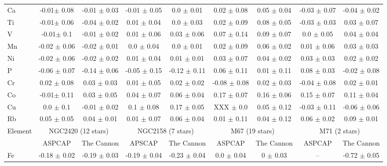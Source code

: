 \documentclass[14pt, preprint2]{aastex6}
\begin{document}
\begin{table}[h]
\begin{tabular}{ | p{} | c| c | c | c | c | c | c | c | }
Ca & -0.01$\pm$ 0.08 & -0.01 $\pm$ 0.03 & -0.01 $\pm$ 0.05  & 0.0 $\pm$ 0.01 & 0.02 $\pm$ 0.08 & 0.05 $\pm$ 0.04 &  -0.03 $\pm$ 0.07 & -0.04 $\pm$ 0.02 \\
Ti & -0.01$\pm$ 0.06 & -0.04 $\pm$ 0.02 & 0.01 $\pm$ 0.04  & 0.0 $\pm$ 0.03 & 0.02 $\pm$ 0.09 & 0.08 $\pm$ 0.05 &  -0.03 $\pm$ 0.03 & 0.03 $\pm$ 0.07 \\
V & -0.01$\pm$ 0.1 &  -0.01 $\pm$ 0.02 & 0.01 $\pm$ 0.06 & 0.03 $\pm$ 0.06 & 0.07 $\pm$ 0.14 & 0.09 $\pm$ 0.07 & 0.0 $\pm$ 0.05  & 0.04 $\pm$ 0.04 \\
Mn & -0.02 $\pm$ 0.06 & -0.02 $\pm$ 0.01  &  0.0 $\pm$ 0.04 & 0.0 $\pm$ 0.01 & 0.02 $\pm$ 0.09 & 0.06 $\pm$ 0.02 & 0.01 $\pm$ 0.06  & 0.03 $\pm$ 0.03 \\
Ni & -0.02 $\pm$ 0.06 & -0.02 $\pm$ 0.02  &  0.01 $\pm$ 0.04 & 0.01 $\pm$ 0.01 & 0.03 $\pm$ 0.07 & 0.04 $\pm$ 0.02 & 0.03 $\pm$ 0.03  & 0.02 $\pm$ 0.02 \\
P & -0.06 $\pm$ 0.07 &  -0.14 $\pm$ 0.06  & -0.05 $\pm$ 0.15 & -0.12 $\pm$ 0.11 & 0.06 $\pm$ 0.11 & 0.01 $\pm$ 0.11 & 0.08 $\pm$ 0.03  & -0.02 $\pm$ 0.08 \\
Cr & 0.02 $\pm$ 0.08 &  0.03 $\pm$ 0.03 &  0.01 $\pm$ 0.05 & 0.02 $\pm$ 0.02 & -0.08 $\pm$ 0.08 &0.02 $\pm$ 0.03 & -0.04 $\pm$ 0.08  &  0.02 $\pm$ 0.01 \\
Co & -0.01$\pm$ 0.11 & 0.03 $\pm$ 0.05 &  0.04 $\pm$ 0.07 & 0.06 $\pm$ 0.04 & 0.17 $\pm$ 0.07 & 0.16 $\pm$ 0.06 &  0.15 $\pm$ 0.07 &  0.11 $\pm$ 0.04 \\
Cu &  0.0 $\pm$ 0.1 & -0.01 $\pm$ 0.02 & 0.1 $\pm$ 0.08 & 0.17 $\pm$ 0.05 & XXX $\pm$ 0.0 & 0.05 $\pm$ 0.12 &  -0.03 $\pm$ 0.11 & -0.06 $\pm$ 0.06 \\
Rb & 0.05 $\pm$ 0.05 & 0.04 $\pm$ 0.01  &  0.01 $\pm$ 0.07 & 0.06 $\pm$ 0.04 & 0.01 $\pm$ 0.11 & 0.04 $\pm$ 0.12 & 0.06 $\pm$ 0.02  & 0.09 $\pm$ 0.01 \\
 \hline
\multicolumn{1}{|c|}{Element}& \multicolumn{2}{|c|}{ NGC2420 (12 stars)} & \multicolumn{2}{|c|}{NGC2158 (7 stars)}  & \multicolumn{2}{|c|}{M67 (19 stars)} & \multicolumn{2}{|c|}{M71 (2 stars) }  \\
\hline
 &  ASPCAP & The Cannon & APSCAP & The Cannon & ASPCAP & The Cannon & ASPCAP  &  The Cannon \\
 \hline
Fe & -0.18 $\pm$ 0.02 & -0.19 $\pm$ 0.03 &  -0.19 $\pm$ 0.04  & -0.23 $\pm$ 0.04 &  0.0 $\pm$ 0.04 &0 $\pm$ 0.03 & -- & -0.72 $\pm$ 0.05 \\

\end{tabular}
\end{table}
\end{document}

